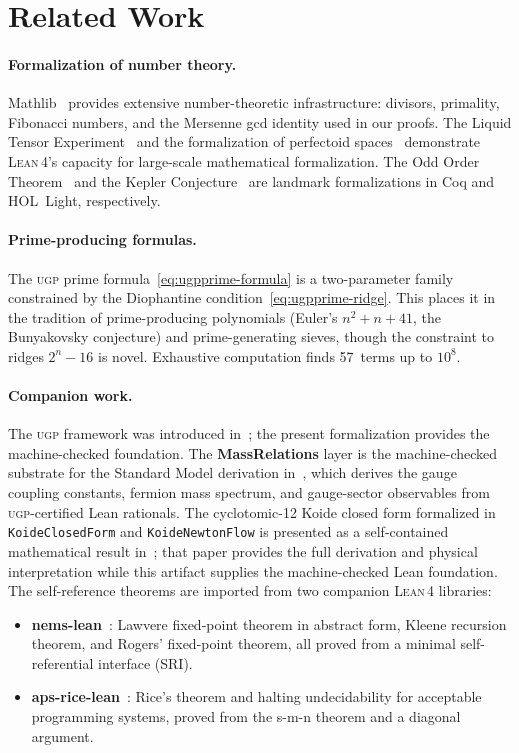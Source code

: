 \documentclass[11pt,a4paper]{article}
\theoremstyle{definition}
\newcommand{\ugp}{\textsc{ugp}}
\newcommand{\lean}{\textsc{Lean}\,4}
\begin{document}
\section{Related Work}\label{sec:related}

\paragraph{Formalization of number theory.}
Mathlib~\cite{mathlib4} provides extensive number-theoretic
infrastructure: divisors, primality, Fibonacci numbers, and the Mersenne
gcd identity used in our proofs.  The Liquid Tensor
Experiment~\cite{LTE2022} and the formalization of perfectoid
spaces~\cite{Buzzard2020} demonstrate \lean{}'s capacity for large-scale
mathematical formalization.  The Odd Order Theorem~\cite{Gonthier2013}
and the Kepler Conjecture~\cite{Hales2017} are landmark formalizations
in Coq and HOL~Light, respectively.

\paragraph{Prime-producing formulas.}
The \ugp{} prime formula~\eqref{eq:ugpprime-formula} is a
two-parameter family constrained by the Diophantine
condition~\eqref{eq:ugpprime-ridge}.  This places it in the tradition of
prime-producing polynomials (Euler's $n^2 + n + 41$, the
Bunyakovsky conjecture) and prime-generating sieves, though the
constraint to ridges $2^n - 16$ is novel.  Exhaustive computation
finds 57~terms up to $10^8$.

\paragraph{Companion work.}
The \ugp{} framework was introduced
in~\cite{SpivackUGP2025}; the present formalization provides the
machine-checked foundation.
The \textbf{MassRelations} layer is the machine-checked substrate for the
Standard Model derivation in~\cite{Spivack2026_SM_UGP}, which derives
the gauge coupling constants, fermion mass spectrum, and gauge-sector
observables from \ugp{}-certified Lean rationals.
The cyclotomic-12 Koide closed form formalized in \texttt{KoideClosedForm}
and \texttt{KoideNewtonFlow} is presented as a self-contained mathematical
result in~\cite{Spivack2026_Koide}; that paper provides the full
derivation and physical interpretation while this artifact supplies the
machine-checked Lean foundation.
The self-reference theorems are imported
from two companion \lean{} libraries:
\begin{itemize}[nosep]
\item \textbf{nems-lean}~\cite{nemsLean2025}: Lawvere
  fixed-point theorem in abstract form, Kleene recursion theorem, and
  Rogers' fixed-point theorem, all proved from a minimal
  self-referential interface (SRI).
\item \textbf{aps-rice-lean}~\cite{apsRiceLean2025}: Rice's theorem and
  halting undecidability for acceptable programming systems, proved from
  the s-m-n theorem and a diagonal argument.
\end{itemize}
\end{document}
